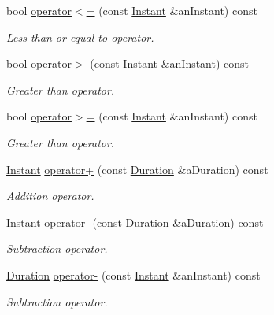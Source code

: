\begin{DoxyCompactItemize}
bool \hyperlink{classostk_1_1physics_1_1time_1_1_instant_a6c9a495ac6041a46602def3c0eaaef33}{operator$<$=} (const \hyperlink{classostk_1_1physics_1_1time_1_1_instant}{Instant} \&an\+Instant) const
\begin{DoxyCompactList}\small\item\em Less than or equal to operator. \end{DoxyCompactList}\item 
bool \hyperlink{classostk_1_1physics_1_1time_1_1_instant_a1e73faadcf3c6724a5e67f35db007697}{operator$>$} (const \hyperlink{classostk_1_1physics_1_1time_1_1_instant}{Instant} \&an\+Instant) const
\begin{DoxyCompactList}\small\item\em Greater than operator. \end{DoxyCompactList}\item 
bool \hyperlink{classostk_1_1physics_1_1time_1_1_instant_af5370a5e8c4b39f46f2baf79105b35cc}{operator$>$=} (const \hyperlink{classostk_1_1physics_1_1time_1_1_instant}{Instant} \&an\+Instant) const
\begin{DoxyCompactList}\small\item\em Greater than operator. \end{DoxyCompactList}\item 
\hyperlink{classostk_1_1physics_1_1time_1_1_instant}{Instant} \hyperlink{classostk_1_1physics_1_1time_1_1_instant_ae3a88555e64eefbdf9953a5f96e8cb1b}{operator+} (const \hyperlink{classostk_1_1physics_1_1time_1_1_duration}{Duration} \&a\+Duration) const
\begin{DoxyCompactList}\small\item\em Addition operator. \end{DoxyCompactList}\item 
\hyperlink{classostk_1_1physics_1_1time_1_1_instant}{Instant} \hyperlink{classostk_1_1physics_1_1time_1_1_instant_acda8b20c4ab0c89b717cf11d750767bc}{operator-\/} (const \hyperlink{classostk_1_1physics_1_1time_1_1_duration}{Duration} \&a\+Duration) const
\begin{DoxyCompactList}\small\item\em Subtraction operator. \end{DoxyCompactList}\item 
\hyperlink{classostk_1_1physics_1_1time_1_1_duration}{Duration} \hyperlink{classostk_1_1physics_1_1time_1_1_instant_aad77e9b8aa2ab6c2d1f18c95a91e6a8e}{operator-\/} (const \hyperlink{classostk_1_1physics_1_1time_1_1_instant}{Instant} \&an\+Instant) const
\begin{DoxyCompactList}\small\item\em Subtraction operator. \end{DoxyCompactList}\item 

\end{DoxyCompactItemize}
